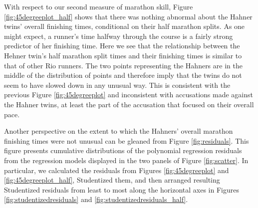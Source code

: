 \documentclass[12pt,titlepage]{article}
\begin{document}
With respect to our second measure of marathon skill, Figure
\ref{fig:45degreeplot_half} shows that there was nothing abnormal
about the Hahner twins' overall finishing times, conditional on their
half marathon splits. As one might expect, a runner's time halfway
through the course is a fairly strong predictor of her finishing time.
Here we see that the relationship between the Hehner twin's half
marathon split times and their finishing times is similar to that of
other Rio runners.  The two points representing the Hahners are in the
middle of the distribution of points and therefore imply that the
twins do not seem to have slowed down in any unusual way.  This is
consistent with the previous Figure \ref{fig:45degreeplot} and
inconsistent with accusations made against the Hahner twins, at least
the part of the accusation that focused on their overall pace.

Another perspective on the extent to which the Hahners' overall
marathon finishing times were not unusual can be gleaned from Figure
\ref{fig:residuals}.  This figure presents cumulative distributions of
the polynomial regression residuals from the regression models
displayed in the two panels of Figure \ref{fig:scatter}.  In
particular, we calculated the residuals from Figures
\ref{fig:45degreeplot} and \ref{fig:45degreeplot_half}, Studentized
them, and then arranged resulting Studentized residuals from least to
most along the horizontal axes in Figures
\ref{fig:studentizedresiduals} and \ref{fig:studentizedresiduals_half}.
\end{document}
